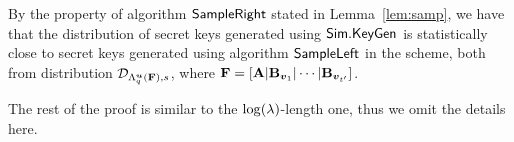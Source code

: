 By the property of algorithm $\mathsf{SampleRight}$ stated in Lemma~\ref{lem:samp}, we have that the distribution of secret keys generated using $\mathsf{Sim}.\mathsf{KeyGen}$ is statistically close to secret keys generated using algorithm $\mathsf{SampleLeft}$ in the scheme, both from distribution $\mathcal{D}_{\Lambda_q^{\boldsymbol{u}}(\mathbf{F}), s}$, where $\mathbf{F} = [\mathbf{A} | \mathbf{B}_{\boldsymbol{v}_1} | \cdots | \mathbf{B}_{\boldsymbol{v}_{t'}}]$.

The rest of the proof is similar to the $\log(\lambda)$-length one, thus we omit the details here.

